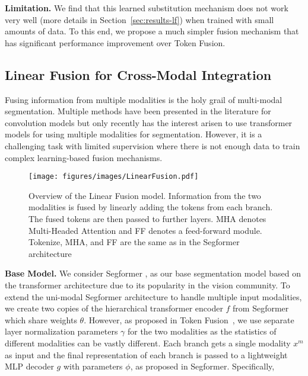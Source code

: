 \documentclass[10pt,twocolumn,letterpaper]{article}
\begin{document}
\noindent\textbf{Limitation.} We find that this learned substitution mechanism does not work very well (more details in Section~\ref{sec:results-lf}) when trained with small amounts of data.
To this end, we propose a much simpler fusion mechanism that has significant performance improvement over Token Fusion.



\subsection{Linear Fusion for Cross-Modal Integration}
\label{sec:method-lf}
Fusing information from multiple modalities is the holy grail of multi-modal segmentation. 
Multiple methods have been presented in the literature for convolution models \cite{cen, cfn, rdfnet, ssma, asymfusion} but only recently has the interest arisen to use transformer models for using multiple modalities for segmentation. 
However, it is a challenging task with limited supervision where there is not enough data to train complex learning-based fusion mechanisms. 

\begin{figure}
\begin{center}
\texttt{[image: figures/images/LinearFusion.pdf]}
\end{center}
\vspace{-5mm}
\caption{Overview of the Linear Fusion model. Information from the two modalities is fused by linearly adding the tokens from each branch. The fused tokens are then passed to further layers. MHA denotes Multi-Headed Attention and FF denotes a feed-forward module. Tokenize, MHA, and FF are the same as in the Segformer \cite{segformer} architecture}
\label{fig:linear-fusion}
\end{figure}
 
\noindent\textbf{Base Model.} We consider Segformer \cite{segformer}, as our base segmentation model based on the transformer architecture due to its popularity in the vision community.
To extend the uni-modal Segformer architecture to handle multiple input modalities, we create two copies of the hierarchical transformer encoder $f$ from Segformer which share weights $\theta$. 
However, as proposed in Token Fusion~\cite{tokenfusion}, we use separate layer normalization parameters $\gamma$ for the two modalities as the statistics of different modalities can be vastly different. 
Each branch gets a single modality $x^m$ as input and the final representation of each branch is passed to a lightweight MLP decoder $g$ with parameters $\phi$, as proposed in Segformer. Specifically, 
\end{document}

